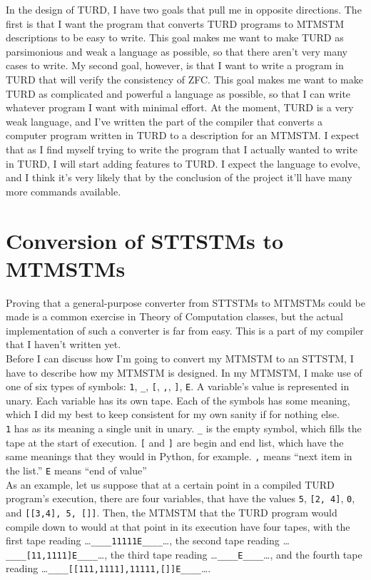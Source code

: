 \documentclass{article}
\begin{document}
In the design of TURD, I have two goals that pull me in opposite directions. The first is that I want the program that converts TURD programs to MTMSTM descriptions to be easy to write. This goal makes me want to make TURD as parsimonious and weak a language as possible, so that there aren't very many cases to write. My second goal, however, is that I want to write a program in TURD that will verify the consistency of ZFC. This goal makes me want to make TURD as complicated and powerful a language as possible, so that I can write whatever program I want with minimal effort. At the moment, TURD is a very weak language, and I've written the part of the compiler that converts a computer program written in TURD to a description for an MTMSTM. I expect that as I find myself trying to write the program that I actually wanted to write in TURD, I will start adding features to TURD. I expect the language to evolve, and I think it's very likely that by the conclusion of the project it'll have many more commands available.

\section{Conversion of STTSTMs to MTMSTMs}
Proving that a general-purpose converter from STTSTMs to MTMSTMs could be made is a common exercise in Theory of Computation classes, but the actual implementation of such a converter is far from easy. This is a part of my compiler that I haven't written yet. \\

Before I can discuss how I'm going to convert my MTMSTM to an STTSTM, I have to describe how my MTMSTM is designed. In my MTMSTM, I make use of one of six types of symbols: \texttt{1}, \texttt{\_}, \texttt{[}, \texttt{,}, \texttt{]}, \texttt{E}. A variable's value is represented in unary. Each variable has its own tape. Each of the symbols has some meaning, which I did my best to keep consistent for my own sanity if for nothing else. \\

\texttt{1} has as its meaning a single unit in unary. \texttt{\_} is the empty symbol, which fills the tape at the start of execution. \texttt{[} and \texttt{]} are begin and end list, which have the same meanings that they would in Python, for example. \texttt{,} means ``next item in the list.'' \texttt{E} means ``end of value''  \\

As an example, let us suppose that at a certain point in a compiled TURD program's execution, there are four variables, that have the values \texttt{5}, \texttt{[2, 4]}, \texttt{0}, and \texttt{[[3,4], 5, []]}. Then, the MTMSTM that the TURD program would compile down to would at that point in its execution have four tapes, with the first tape reading \dots\texttt{\_\_\_\_11111E\_\_\_\_}\dots, the second tape reading \dots\texttt{\_\_\_\_[11,1111]E\_\_\_\_}\dots, the third tape reading \dots\texttt{\_\_\_\_E\_\_\_\_}\dots, and the fourth tape reading \dots\texttt{\_\_\_\_[[111,1111],11111,[]]E\_\_\_\_}\dots. \\
\end{document}

